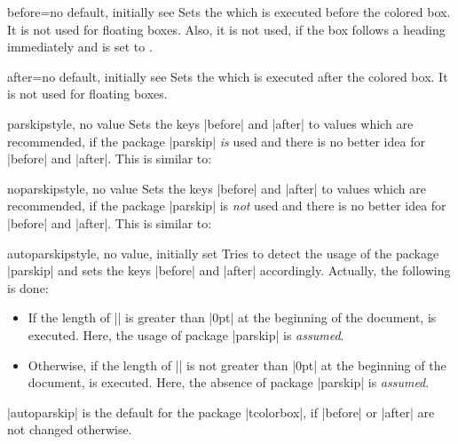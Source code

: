 \begin{docTcbKey}{before}{=}{no default, initially see }
  Sets the  which is executed before the colored box.
  It is not used for floating boxes.
  Also, it is not used, if the box follows a heading immediately
  and  is set to .
\end{docTcbKey}

\begin{docTcbKey}{after}{=}{no default, initially see }
  Sets the  which is executed after the colored box.
  It is not used for floating boxes.
\end{docTcbKey}

\begin{docTcbKey}{parskip}{}{style, no value}
  Sets the keys |before| and |after| to values which are
  recommended, if the package |parskip| \emph{is} used and there is no better
  idea for |before| and |after|. This is similar to:
\begin{dispListing}
\end{dispListing}
\end{docTcbKey}

\begin{docTcbKey}[][doc updated=2016-02-14]{noparskip}{}{style, no value}
  Sets the keys |before| and |after| to values which are
  recommended, if the package |parskip| is \emph{not} used and there is no better
  idea for |before| and |after|. This is similar to:
\begin{dispListing}
\end{dispListing}
\end{docTcbKey}

\begin{docTcbKey}{autoparskip}{}{style, no value, initially set}
  Tries to detect the usage of the package |parskip| and sets
  the keys |before| and |after| accordingly. Actually, the following is done:
  \begin{itemize}
  \item If the length of |\parskip| is greater than |0pt| at the beginning of the document,
     is executed. Here, the usage of package |parskip| is \emph{assumed}.
  \item Otherwise, if the length of |\parskip| is not greater than |0pt| at the beginning of the document,
     is executed. Here, the absence of package |parskip| is \emph{assumed}.
  \end{itemize}
  |autoparskip| is the default for the package |tcolorbox|, if |before| or |after|
  are not changed otherwise.
\end{docTcbKey}

